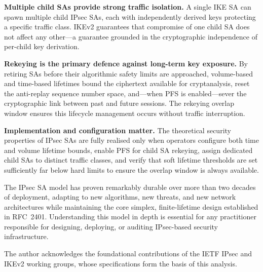 \documentclass[sigconf,nonacm]{acmart}
\begin{document}
\textbf{Multiple child SAs provide strong traffic isolation.} A single IKE SA can
spawn multiple child IPsec SAs, each with independently derived keys protecting a
specific traffic class. IKEv2 guarantees that compromise of one child SA does not
affect any other---a guarantee grounded in the cryptographic independence of
per-child key derivation.

\textbf{Rekeying is the primary defence against long-term key exposure.} By retiring
SAs before their algorithmic safety limits are approached, volume-based and time-based
lifetimes bound the ciphertext available for cryptanalysis, reset the anti-replay
sequence number space, and---when PFS is enabled---sever the cryptographic link between
past and future sessions. The rekeying overlap window ensures this lifecycle management
occurs without traffic interruption.

\textbf{Implementation and configuration matter.} The theoretical security properties
of IPsec SAs are fully realised only when operators configure both time and volume
lifetime bounds, enable PFS for child SA rekeying, assign dedicated child SAs to
distinct traffic classes, and verify that soft lifetime thresholds are set sufficiently
far below hard limits to ensure the overlap window is always available.

The IPsec SA model has proven remarkably durable over more than two decades of
deployment, adapting to new algorithms, new threats, and new network architectures
while maintaining the core simplex, finite-lifetime design established in RFC~2401.
Understanding this model in depth is essential for any practitioner responsible for
designing, deploying, or auditing IPsec-based security infrastructure.

\begin{acks}
The author acknowledges the foundational contributions of the IETF IPsec and IKEv2
working groups, whose specifications form the basis of this analysis.
\end{acks}
\end{document}
